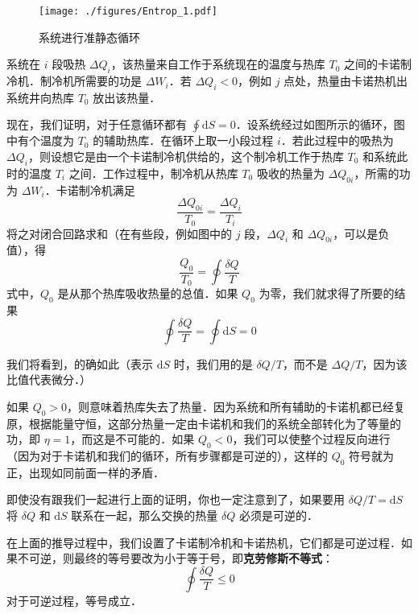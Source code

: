 \begin{figure}[ht]
\centering
\texttt{[image: ./figures/Entrop\_1.pdf]}
\caption{系统进行准静态循环} \label{Entrop_fig1}
\end{figure}

系统在 $i$ 段吸热 $\Delta Q_i$，该热量来自工作于系统现在的温度与热库 $T_0$ 之间的卡诺制冷机．制冷机所需要的功是 $\Delta W_i$．若 $\Delta Q_i<0$，例如 $j$ 点处，热量由卡诺热机出系统井向热库 $T_0$ 放出该热量．

现在，我们证明，对于任意循环都有 $\oint \mathrm d S =0 $．设系统经过如图所示的循环，图中有个温度为 $T_0$ 的辅助热库．在循环上取一小段过程 $i$．若此过程中的吸热为 $\Delta Q_i$，则设想它是由一个卡诺制冷机供给的，这个制冷机工作于热库 $T_0$ 和系统此时的温度 $T_i$ 之间．工作过程中，制冷机从热库 $T_0$ 吸收的热量为 $\Delta Q_{0i}$，所需的功为 $\Delta W_i$．卡诺制冷机满足
\begin{equation}
\frac{\Delta Q_{0i}}{T_0}=\frac{\Delta Q_i}{T_i}
\end{equation}
将之对闭合回路求和（在有些段，例如图中的 $j$ 段，$\Delta Q_i$ 和 $\Delta Q_{0i}$，可以是负值），得
\begin{equation}
\frac{Q_0}{T_0}=\oint{\frac{\delta Q}{T}}
\end{equation}
式中，$Q_0$ 是从那个热库吸收热量的总值．如果 $Q_0$ 为零，我们就求得了所要的结果
\begin{equation}
\oint{\frac{\delta Q}{T}=\oint{\text{d}S=0}}
\end{equation}

我们将看到，的确如此（表示 $\mathrm dS $ 时，我们用的是 $\delta Q/T$，而不是 $\Delta Q/T$，因为该比值代表微分．）

如果 $Q_0>0$，则意味着热库失去了热量．因为系统和所有辅助的卡诺机都已经复原，根据能量守恒，这部分热量一定由卡诺机和我们的系统全部转化为了等量的功，即 $\eta=1$，而这是不可能的．如果 $Q_0<0$，我们可以使整个过程反向进行（因为对于卡诺机和我们的循环，所有步骤都是可逆的），这样的 $Q_0$ 符号就为正，出现如同前面一样的矛盾．

即使没有跟我们一起进行上面的证明，你也一定注意到了，如果要用 $\delta Q/T=\mathrm d S$ 将 $\delta Q$ 和 $\mathrm dS$ 联系在一起，那么交换的热量 $\delta Q$ 必须是可逆的．

在上面的推导过程中，我们设置了卡诺制冷机和卡诺热机，它们都是可逆过程．如果不可逆，则最终的等号要改为小于等于号，即\textbf{克劳修斯不等式}：
\begin{equation}
\oint \frac{\delta Q}{T}\le 0
\end{equation}
对于可逆过程，等号成立．

